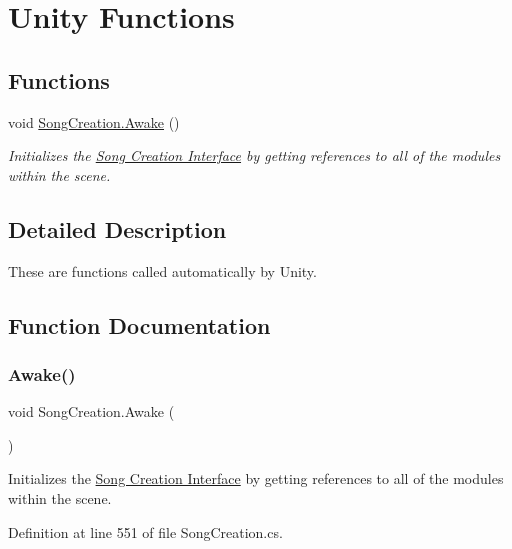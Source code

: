 \hypertarget{group___s_c_unity}{}\section{Unity Functions}
\label{group___s_c_unity}
\subsection*{Functions}
\begin{DoxyCompactItemize}
\item 
void \hyperlink{group___s_c_unity_ga0130f42289ace34cb59f70eedc858757}{Song\+Creation.\+Awake} ()
\begin{DoxyCompactList}\small\item\em Initializes the \hyperlink{group___doc_s_c}{Song Creation Interface} by getting references to all of the modules within the scene. \end{DoxyCompactList}\end{DoxyCompactItemize}


\subsection{Detailed Description}
These are functions called automatically by Unity. 

\subsection{Function Documentation}
\mbox{\label{group___s_c_unity_ga0130f42289ace34cb59f70eedc858757}} 
\subsubsection{\texorpdfstring{Awake()}{Awake()}}
{\footnotesize\ttfamily void Song\+Creation.\+Awake (\begin{DoxyParamCaption}{ }\end{DoxyParamCaption})\hspace{0.3cm}{\ttfamily [private]}}



Initializes the \hyperlink{group___doc_s_c}{Song Creation Interface} by getting references to all of the modules within the scene. 



Definition at line 551 of file Song\+Creation.\+cs.



